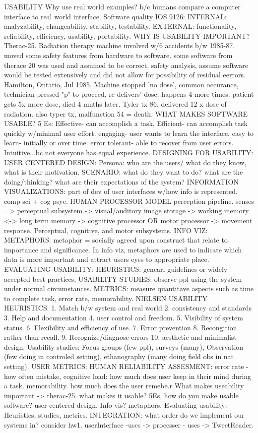 \documentclass[10pt]{article}
\begin{document}
\begin{landscape}
\begin{multicols*}{6}
USABILITY
Why use real world examples? b/c bumans compare a computer interface to real world interface. Software quality IOS 9126: INTERNAL: analyzability, changeability, stability, testability. EXTERNAL: functionality, reliability, efficiency, usability, portability. WHY IS USABILITY IMPORTANT? Therac-25. Radiation therapy machine involved w/6 accidents b/w 1985-87. moved some safety features from hardware to software. some software from therace 20 was used and assumed to be correct. safety analysis, assume software would be tested extensively and did not allow for possibility of residual eerrors. Hamilton, Ontario, Jul 1985. Machine stopped 'no dose', common occurance, technician pressed "p" to proceed, re-delivers' dose. happens 4 more times. patient gets 5x more dose, died 4 mnths later. Tyler tx 86. delivered 12 x dose of radiation. also typer tx, malfunction 54 = death. WHAT MAKES SOFTWARE USABLE? 5 Es: Effective- can accomplish a task, Efficient- can accomplish task quickly w/minimal user effort. engaging- user wants to learn the interface, easy to learn- initially or over time. error tolerant- able to recover from user errors. Intuitive...bc not everyone has equal experience. DESIGNING FOR USABILITY: USER CENTERED DESIGN: Persona: who are the users/ what do they know, what is their motivation. SCENARIO: what do they want to do? what are the doing/thinking? what are their expectations of the system? INFORMATION VISUALIZATIONS: part of dev of user interfaces w/how info is represented. comp sci + cog psyc. HUMAN PROCESSOR MODEL perception pipeline. senses => perceptual subsystem -> visual/auditory image storage -> working memory <-> long term memory -> cognitive processor OR motor processor -> movement response. Perceptual, cognitive, and motor subsystems. INFO VIZ: METAPHORS: metaphor = socially agreed upon construct that relate to importance and significance. In info viz, metaphors are used to indicate which data is more important and attract users eyes to appropriate place. EVALUATING USABILITY: HEURISTICS: genearl guidelines or widely accepted best practices, USABILITY STUDIES: observe ppl using the system under normal circumstances. METRICS: measure quantitave aspects such as time to complete task, error rate, memorability. NIELSEN USABILITY HEURISTICS: 1. Match b/w system and real world 2. consistency and standards 3. Help and documentation 4. user control and freedom. 5. Visibility of system status. 6. Flexibility and efficiency of use. 7. Error prevention 8. Recongition rather than recall. 9. Recognize/diagnose errors 10. aesthetic and minimalist design. Usability studies: Focus groups (few ppl), surveys (many), Observation (few doing in controled setting), ethanography (many doing field obs in nat setting). USER METRICS: HUMAN RELIABILITY ASSESMENT: error rate - how often mistake, cognitive load: how much does user keep in their mind during a task. memorability. how much does the user remebe.r  What makes useability important -> therac-25. what makes it usable? 5Es, how do you make usable software? user-centered design. Info vis? metaphors. Evaluating usability: Heuristics, studies, metrics. INTEGRATION: what order do we implement our systems in? consider hw1. userInterface -uses -> processer - uses -> TweetReader. 
\end{multicols*}
\end{landscape}
\end{document}
